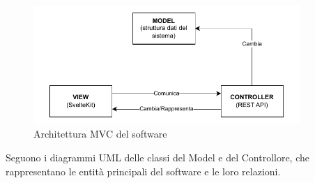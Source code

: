 \documentclass[a4paper]{article}
\begin{document}
\begin{figure}[H]
  \begin{center}
    \includegraphics[width=0.9\textwidth]{MVC.pdf}
  \end{center}
  \caption{Architettura MVC del software} 
  \label{fig:mvc}
\end{figure}
\noindent
Seguono i diagrammi UML delle classi del Model e del Controllore, che rappresentano le entità principali del software e le loro relazioni.
\end{document}
